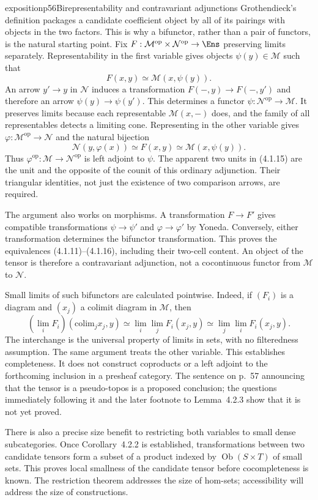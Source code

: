 \begin{dcomment}{exposition}{p56}{Birepresentability and contravariant adjunctions}
Grothendieck's definition packages a candidate coefficient object by all of its pairings with objects in the two factors. This is why a bifunctor, rather than a pair of functors, is the natural starting point. Fix $F:\mathcal M^{\mathrm{op}}\times\mathcal N^{\mathrm{op}}\to\Ens$ preserving limits separately. Representability in the first variable gives objects $\psi(y)\in\mathcal M$ such that
\[
 F(x,y)\simeq\mathcal M(x,\psi(y)).
\]
An arrow $y'\to y$ in $\mathcal N$ induces a transformation $F(-,y)\to F(-,y')$ and therefore an arrow $\psi(y)\to\psi(y')$. This determines a functor $\psi:\mathcal N^{\mathrm{op}}\to\mathcal M$. It preserves limits because each representable $\mathcal M(x,-)$ does, and the family of all representables detects a limiting cone. Representing in the other variable gives $\varphi:\mathcal M^{\mathrm{op}}\to\mathcal N$ and the natural bijection
\[
 \mathcal N(y,\varphi(x))\simeq F(x,y)
 \simeq\mathcal M(x,\psi(y)).
\]
Thus $\varphi^{\mathrm{op}}:\mathcal M\to\mathcal N^{\mathrm{op}}$ is left adjoint to $\psi$. The apparent two units in (4.1.15) are the unit and the opposite of the counit of this ordinary adjunction. Their triangular identities, not just the existence of two comparison arrows, are required.

The argument also works on morphisms. A transformation $F\to F'$ gives compatible transformations $\psi\to\psi'$ and $\varphi\to\varphi'$ by Yoneda. Conversely, either transformation determines the bifunctor transformation. This proves the equivalences (4.1.11)--(4.1.16), including their two-cell content. An object of the tensor is therefore a contravariant adjunction, not a cocontinuous functor from $\mathcal M$ to $\mathcal N$.

Small limits of such bifunctors are calculated pointwise. Indeed, if $(F_i)$ is a diagram and $(x_j)$ a colimit diagram in $\mathcal M$, then
\[
 \left(\lim_iF_i\right)(\mathrm{colim}_jx_j,y)
 \simeq\lim_i\lim_jF_i(x_j,y)
 \simeq\lim_j\lim_iF_i(x_j,y).
\]
The interchange is the universal property of limits in sets, with no filteredness assumption. The same argument treats the other variable. This establishes completeness. It does not construct coproducts or a left adjoint to the forthcoming inclusion in a presheaf category. The sentence on p.~57 announcing that the tensor is a pseudo-topos is a proposed conclusion; the questions immediately following it and the later footnote to Lemma~4.2.3 show that it is not yet proved.

There is also a precise size benefit to restricting both variables to small dense subcategories. Once Corollary~4.2.2 is established, transformations between two candidate tensors form a subset of a product indexed by $\operatorname{Ob}(S\times T)$ of small sets. This proves local smallness of the candidate tensor before cocompleteness is known. The restriction theorem addresses the size of hom-sets; accessibility will address the size of constructions.
\end{dcomment}

